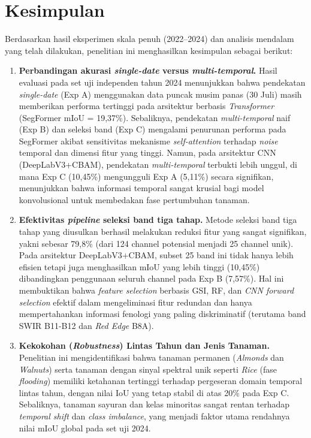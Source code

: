 
\section{Kesimpulan}

Berdasarkan hasil eksperimen skala penuh (2022--2024) dan analisis mendalam yang telah dilakukan, penelitian ini menghasilkan kesimpulan sebagai berikut:

\begin{enumerate}

    \item \textbf{Perbandingan akurasi \textit{single-date} versus \textit{multi-temporal}.}
    Hasil evaluasi pada set uji independen tahun 2024 menunjukkan bahwa pendekatan \textit{single-date} (Exp A) menggunakan data puncak musim panas (30 Juli) masih memberikan performa tertinggi pada arsitektur berbasis \textit{Transformer} (SegFormer mIoU = 19,37\%). Sebaliknya, pendekatan \textit{multi-temporal} naif (Exp B) dan seleksi band (Exp C) mengalami penurunan performa pada SegFormer akibat sensitivitas mekanisme \textit{self-attention} terhadap \textit{noise} temporal dan dimensi fitur yang tinggi. Namun, pada arsitektur CNN (DeepLabV3+CBAM), pendekatan \textit{multi-temporal} terbukti lebih unggul, di mana Exp C (10,45\%) mengungguli Exp A (5,11\%) secara signifikan, menunjukkan bahwa informasi temporal sangat krusial bagi model konvolusional untuk membedakan fase pertumbuhan tanaman.

    \item \textbf{Efektivitas \textit{pipeline} seleksi band tiga tahap.}
    Metode seleksi band tiga tahap yang diusulkan berhasil melakukan reduksi fitur yang sangat signifikan, yakni sebesar 79,8\% (dari 124 channel potensial menjadi 25 channel unik). Pada arsitektur DeepLabV3+CBAM, subset 25 band ini tidak hanya lebih efisien tetapi juga menghasilkan mIoU yang lebih tinggi (10,45\%) dibandingkan penggunaan seluruh channel pada Exp B (7,57\%). Hal ini membuktikan bahwa \textit{feature selection} berbasis GSI, RF, dan \textit{CNN forward selection} efektif dalam mengeliminasi fitur redundan dan hanya mempertahankan informasi fenologi yang paling diskriminatif (terutama band SWIR B11-B12 dan \textit{Red Edge} B8A).

    \item \textbf{Kekokohan (\textit{Robustness}) Lintas Tahun dan Jenis Tanaman.}
    Penelitian ini mengidentifikasi bahwa tanaman permanen (\textit{Almonds} dan \textit{Walnuts}) serta tanaman dengan sinyal spektral unik seperti \textit{Rice} (fase \textit{flooding}) memiliki ketahanan tertinggi terhadap pergeseran domain temporal lintas tahun, dengan nilai IoU yang tetap stabil di atas 20\% pada Exp C. Sebaliknya, tanaman sayuran dan kelas minoritas sangat rentan terhadap \textit{temporal shift} dan \textit{class imbalance}, yang menjadi faktor utama rendahnya nilai mIoU global pada set uji 2024.


\end{enumerate}
